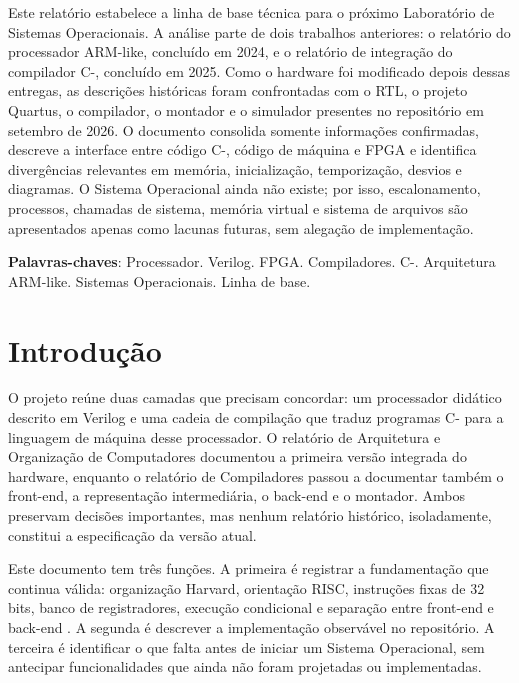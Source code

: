 \documentclass[
  12pt,
  oneside,
  a4paper,
  english,
  french,
  spanish,
  brazilian,
]{abntex2}
\begin{document}
\frenchspacing

\imprimircapa
\imprimirfolhaderosto*

\setlength{\absparsep}{18pt}
\begin{resumo}
Este relatório estabelece a linha de base técnica para o próximo Laboratório de Sistemas Operacionais. A análise parte de dois trabalhos anteriores: o relatório do processador ARM-like, concluído em 2024, e o relatório de integração do compilador C-, concluído em 2025. Como o hardware foi modificado depois dessas entregas, as descrições históricas foram confrontadas com o RTL, o projeto Quartus, o compilador, o montador e o simulador presentes no repositório em setembro de 2026. O documento consolida somente informações confirmadas, descreve a interface entre código C-, código de máquina e FPGA e identifica divergências relevantes em memória, inicialização, temporização, desvios e diagramas. O Sistema Operacional ainda não existe; por isso, escalonamento, processos, chamadas de sistema, memória virtual e sistema de arquivos são apresentados apenas como lacunas futuras, sem alegação de implementação.

\noindent
\textbf{Palavras-chaves}: Processador. Verilog. FPGA. Compiladores. C-. Arquitetura ARM-like. Sistemas Operacionais. Linha de base.
\end{resumo}

\listoffigures*
\clearpage
{}
\listoftables*
\clearpage
{}
\tableofcontents*

\textual

\chapter{Introdução}
\label{cap:introducao}

O projeto reúne duas camadas que precisam concordar: um processador didático descrito em Verilog e uma cadeia de compilação que traduz programas C- para a linguagem de máquina desse processador. O relatório de Arquitetura e Organização de Computadores documentou a primeira versão integrada do hardware, enquanto o relatório de Compiladores passou a documentar também o front-end, a representação intermediária, o back-end e o montador. Ambos preservam decisões importantes, mas nenhum relatório histórico, isoladamente, constitui a especificação da versão atual.

Este documento tem três funções. A primeira é registrar a fundamentação que continua válida: organização Harvard, orientação RISC, instruções fixas de 32 bits, banco de registradores, execução condicional e separação entre front-end e back-end \cite{patterson2017,compOrgDes,compiladoresLouden}. A segunda é descrever a implementação observável no repositório. A terceira é identificar o que falta antes de iniciar um Sistema Operacional, sem antecipar funcionalidades que ainda não foram projetadas ou implementadas.
\end{document}
